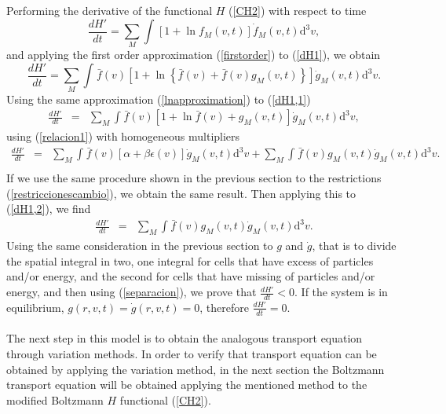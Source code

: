 \documentclass{article}
\begin{document}
Performing the derivative of the functional $H$ (\ref{CH2}) with respect to time
\begin{equation}
    \frac{dH'}{dt}=\sum_M\int_{}^{}\left[ 1+\ln f_M(v,t) \right]\dot f_M(v,t) \mathrm{d}^3v  \label{dH1},
\end{equation}{}
and applying the first order approximation (\ref{firstorder}) to (\ref{dH1}), we obtain
\begin{equation}
    \frac{dH'}{dt}=\sum_M\int_{}^{}\bar f(v) \left [ 1+\ln \left\{ \bar f(v)+\bar f(v)g_M(v,t) \right\} \right]\dot g_M(v,t)\mathrm{d}^3v  \label{dH1,1}.
\end{equation}{}
Using the same approximation (\ref{lnapproximation})
to (\ref{dH1,1}) 
\begin{eqnarray}
\frac{dH'}{dt}&=&\sum_M \int_{}^{} \bar f(v)\left[ 1+\ln \bar f(v)+g_M(v,t) \right]\dot g_M(v,t)\mathrm{d}^3v,
\end{eqnarray}{}
using (\ref{relacion1}) with homogeneous multipliers
\begin{eqnarray}
\frac{dH'}{dt}&=&\sum_M\int_{}^{}\bar f(v)\left[ \alpha+\beta \epsilon(v) \right]\dot g_M(v,t)\mathrm{d}^3v +\sum_M\int_{}^{}\bar f(v)g_M(v,t)\dot g_M(v,t)\mathrm{d}^3v \label{dH1,2}. \nonumber \\
\end{eqnarray}{}
If we use the same procedure shown in the previous section to the restrictions (\ref{restriccionescambio}), we obtain the same result. Then applying this to (\ref{dH1,2}), we find
\begin{eqnarray}
\frac{dH'}{dt}&=&\sum_M\int_{}^{}\bar f(v)g_M(v,t)\dot g_M(v,t)\mathrm{d}^3v.
\end{eqnarray}{}
Using the same consideration in the previous section to $g$ and $\dot g$, that is to divide the spatial integral in two, one integral for cells that have excess of particles and/or energy, and the second for cells that have missing of particles and/or energy, and then using (\ref{separacion}), we prove that $\frac{dH'}{dt}<0$. If the system is in equilibrium, $g(r,v,t)=\dot g(r,v,t)=0$, therefore $\frac{dH'}{dt}=0$. 
\\
\\
The next step in this model is to obtain the analogous transport equation through variation methods. In order to verify that transport equation can be obtained by applying the variation method, in the next section the Boltzmann transport equation will be obtained applying the mentioned method to the modified Boltzmann $H$ functional (\ref{CH2}).
\end{document}
